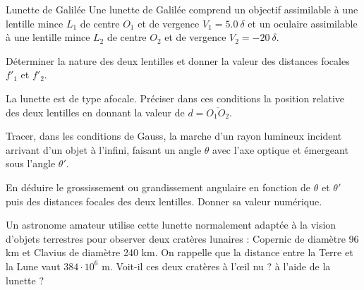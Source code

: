 \begin{exo}[MPSI]{Lunette de Galilée}
Une lunette de Galilée comprend un objectif assimilable à une lentille mince $L_1$ de centre $O_1$ et de vergence $V_1 = \SI{5.0}{\delta}$ et un oculaire assimilable à une lentille mince $L_2$ de centre $O_2$ et de vergence $V_2 = \SI{-20}{\delta}$.


\begin{quest}
\item Déterminer la nature des deux lentilles et donner la valeur des distances focales $f'_1$ et $f'_2$.


\item La lunette est de type afocale. Préciser dans ces conditions la position relative des deux lentilles en donnant la valeur de $d = \overline{O_1 O_2}$.


\item Tracer, dans les conditions de Gauss, la marche d’un rayon lumineux incident arrivant d’un objet à l’infini, faisant un angle $\theta$ avec l’axe optique et émergeant sous l’angle $\theta'$.


\item En déduire le grossissement ou grandissement angulaire en fonction de $\theta$ et $\theta'$ puis des distances focales des deux lentilles. Donner sa valeur numérique.


\item Un astronome amateur utilise cette lunette normalement adaptée à la vision d’objets terrestres pour observer deux cratères lunaires : Copernic de diamètre 96 km et Clavius de
diamètre 240 km. On rappelle que la distance entre la Terre et la Lune vaut $384\cdot 10^6$ m. Voit-il ces deux cratères à l'œil nu ? à l’aide de la lunette ?


%

\end{quest}
\end{exo}

